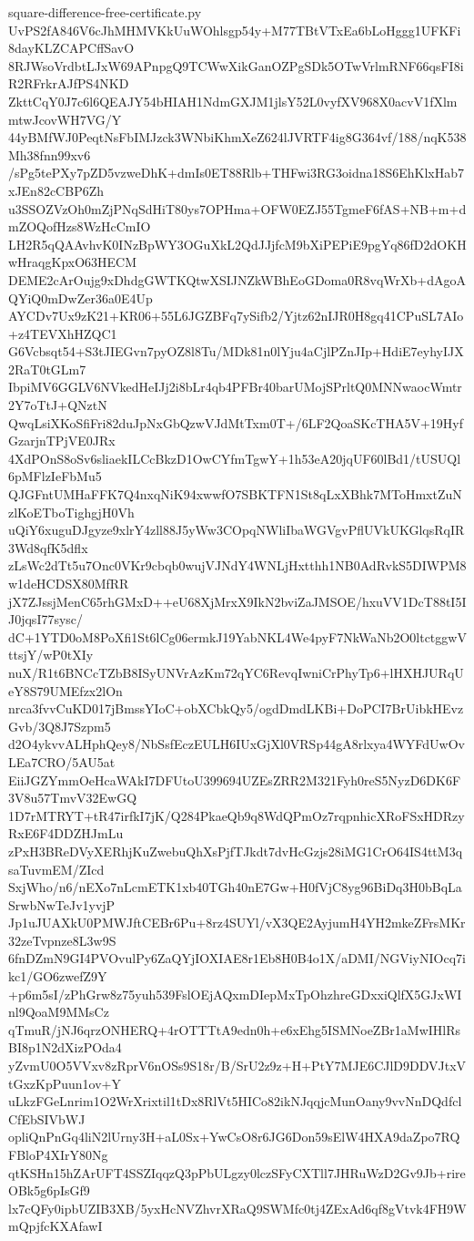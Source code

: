 \documentclass[11pt]{article}
\theoremstyle{definition}
\theoremstyle{remark}
\begin{document}
\begin{filecontents*}[overwrite]{square-difference-free-certificate.py}
UvPS2fA846V6cJhMHMVKkUuWOhlsgp54y+M77TBtVTxEa6bLoHggg1UFKFi8dayKLZCAPCffSavO
8RJWsoVrdbtLJxW69APnpgQ9TCWwXikGanOZPgSDk5OTwVrlmRNF66qsFI8iR2RFrkrAJfPS4NKD
ZkttCqY0J7c6l6QEAJY54bHIAH1NdmGXJM1jlsY52L0vyfXV968X0acvV1fXlmmtwJcovWH7VG/Y
44yBMfWJ0PeqtNsFbIMJzck3WNbiKhmXeZ624lJVRTF4ig8G364vf/188/nqK538Mh38fnn99xv6
/sPg5tePXy7pZD5vzweDhK+dmIs0ET88Rlb+THFwi3RG3oidna18S6EhKlxHab7xJEn82cCBP6Zh
u3SSOZVzOh0mZjPNqSdHiT80ys7OPHma+OFW0EZJ55TgmeF6fAS+NB+m+dmZOQofHzs8WzHcCmIO
LH2R5qQAAvhvK0INzBpWY3OGuXkL2QdJJjfcM9bXiPEPiE9pgYq86fD2dOKHwHraqgKpxO63HECM
DEME2cArOujg9xDhdgGWTKQtwXSIJNZkWBhEoGDoma0R8vqWrXb+dAgoAQYiQ0mDwZer36a0E4Up
AYCDv7Ux9zK21+KR06+55L6JGZBFq7ySifb2/Yjtz62nIJR0H8gq41CPuSL7AIo+z4TEVXhHZQC1
G6Vcbsqt54+S3tJIEGvn7pyOZ8l8Tu/MDk81n0lYju4aCjlPZnJIp+HdiE7eyhyIJX2RaT0tGLm7
IbpiMV6GGLV6NVkedHeIJj2i8bLr4qb4PFBr40barUMojSPrltQ0MNNwaocWmtr2Y7oTtJ+QNztN
QwqLsiXKoSfiFri82duJpNxGbQzwVJdMtTxm0T+/6LF2QoaSKcTHA5V+19HyfGzarjnTPjVE0JRx
4XdPOnS8oSv6sliaekILCcBkzD1OwCYfmTgwY+1h53eA20jqUF60lBd1/tUSUQl6pMFlzIeFbMu5
QJGFntUMHaFFK7Q4nxqNiK94xwwfO7SBKTFN1St8qLxXBhk7MToHmxtZuNzlKoETboTighgjH0Vh
uQiY6xuguDJgyze9xlrY4zll88J5yWw3COpqNWliIbaWGVgvPflUVkUKGlqsRqIR3Wd8qfK5dflx
zLsWc2dTt5u7Onc0VKr9cbqb0wujVJNdY4WNLjHxtthh1NB0AdRvkS5DIWPM8w1deHCDSX80MfRR
jX7ZJssjMenC65rhGMxD++eU68XjMrxX9IkN2bviZaJMSOE/hxuVV1DcT88tI5IJ0jqsI77sysc/
dC+1YTD0oM8PoXfi1St6lCg06ermkJ19YabNKL4We4pyF7NkWaNb2O0ltctggwVttsjY/wP0tXIy
nuX/R1t6BNCcTZbB8ISyUNVrAzKm72qYC6RevqIwniCrPhyTp6+lHXHJURqUeY8S79UMEfzx2lOn
nrca3fvvCuKD017jBmssYIoC+obXCbkQy5/ogdDmdLKBi+DoPCI7BrUibkHEvzGvb/3Q8J7Szpm5
d2O4ykvvALHphQey8/NbSsfEczEULH6IUxGjXl0VRSp44gA8rlxya4WYFdUwOvLEa7CRO/5AU5at
EiiJGZYmmOeHcaWAkI7DFUtoU399694UZEsZRR2M321Fyh0reS5NyzD6DK6F3V8u57TmvV32EwGQ
1D7rMTRYT+tR47irfkI7jK/Q284PkaeQb9q8WdQPmOz7rqpnhicXRoFSxHDRzyRxE6F4DDZHJmLu
zPxH3BReDVyXERhjKuZwebuQhXsPjfTJkdt7dvHcGzjs28iMG1CrO64IS4ttM3qsaTuvmEM/ZIcd
SxjWho/n6/nEXo7nLcmETK1xb40TGh40nE7Gw+H0fVjC8yg96BiDq3H0bBqLaSrwbNwTeJv1yvjP
Jp1uJUAXkU0PMWJftCEBr6Pu+8rz4SUYl/vX3QE2AyjumH4YH2mkeZFrsMKr32zeTvpnze8L3w9S
6fnDZmN9GI4PVOvulPy6ZaQYjIOXIAE8r1Eb8H0B4o1X/aDMI/NGViyNIOcq7ikc1/GO6zwefZ9Y
+p6m5sI/zPhGrw8z75yuh539FslOEjAQxmDIepMxTpOhzhreGDxxiQlfX5GJxWInl9QoaM9MMsCz
qTmuR/jNJ6qrzONHERQ+4rOTTTtA9edn0h+e6xEhg5ISMNoeZBr1aMwIHlRsBI8p1N2dXizPOda4
yZvmU0O5VVxv8zRprV6nOSs9S18r/B/SrU2z9z+H+PtY7MJE6CJlD9DDVJtxVtGxzKpPuun1ov+Y
uLkzFGeLnrim1O2WrXrixtil1tDx8RlVt5HICo82ikNJqqjcMunOany9vvNnDQdfclCfEbSIVbWJ
opliQnPnGq4liN2lUrny3H+aL0Sx+YwCsO8r6JG6Don59sElW4HXA9daZpo7RQFBloP4XIrY80Ng
qtKSHn15hZArUFT4SSZIqqzQ3pPbULgzy0lczSFyCXTll7JHRuWzD2Gv9Jb+rireOBk5g6pIsGf9
lx7cQFy0ipbUZIB3XB/5yxHcNVZhvrXRaQ9SWMfc0tj4ZExAd6qf8gVtvk4FH9WmQpjfcKXAfawI

\end{filecontents*}
\end{document}
